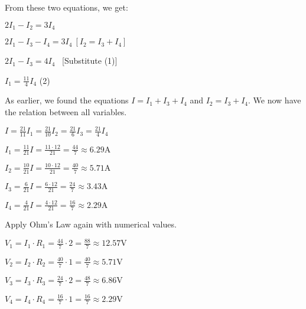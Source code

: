 \documentclass{article}
\begin{document}
{\Large From these two equations, we get:}

\vspace{4mm}

{\Large $2I_1 - I_2 = 3I_4$}

{\Large $2I_1 - I_3 - I_4 = 3I_4 \ [I_2 = I_3 + I_4]$}

{\Large $2I_1 - I_3 = 4I_4$ \ [Substitute (1)]}

{\Large $\displaystyle I_1 = \frac{11}{4}I_4$ (2)}

\vspace{4mm}

{\Large As earlier, we found the equations $I = I_1 + I_3 + I_4$ and $I_2 = I_3 + I_4$. We now have the relation between all variables.}

\vspace{4mm}

{\Large $\displaystyle I = \frac{21}{11}I_1 = \frac{21}{10}I_2 = \frac{21}{6}I_3 = \frac{21}{4}I_4$}

\vspace{4mm}

{\Large $\displaystyle \boxed{I_1 = \frac{11}{21}I = \frac{11\cdot 12}{21} = \frac{44}{7} \approx 6.29 \text{A}}$}

{\Large $\displaystyle \boxed{I_2 = \frac{10}{21}I = \frac{10\cdot 12}{21} = \frac{40}{7}  \approx 5.71 \text{A}}$}

{\Large $\displaystyle \boxed{I_3 = \frac{6}{21}I = \frac{6\cdot 12}{21} = \frac{24}{7}  \approx 3.43 \text{A}}$}

{\Large $\displaystyle \boxed{I_4 = \frac{4}{21}I = \frac{4\cdot 12}{21} = \frac{16}{7}  \approx 2.29 \text{A}}$}

\vspace{4mm}

{\Large Apply Ohm's Law again with numerical values.}

\vspace{4mm}

{\Large $\displaystyle \boxed{V_1 = I_1\cdot R_1 = \frac{44}{7} \cdot 2 = \frac{88}{7} \approx 12.57 \text{V}}$}

{\Large $\displaystyle \boxed{V_2 = I_2\cdot R_2 = \frac{40}{7} \cdot 1 = \frac{40}{7} \approx 5.71 \text{V}}$}

{\Large $\displaystyle \boxed{V_3 = I_3\cdot R_3 = \frac{24}{7} \cdot 2 = \frac{48}{7} \approx 6.86 \text{V}}$}

{\Large $\displaystyle \boxed{V_4 = I_4\cdot R_4 = \frac{16}{7} \cdot 1 = \frac{16}{7} \approx 2.29 \text{V}}$}
\end{document}
